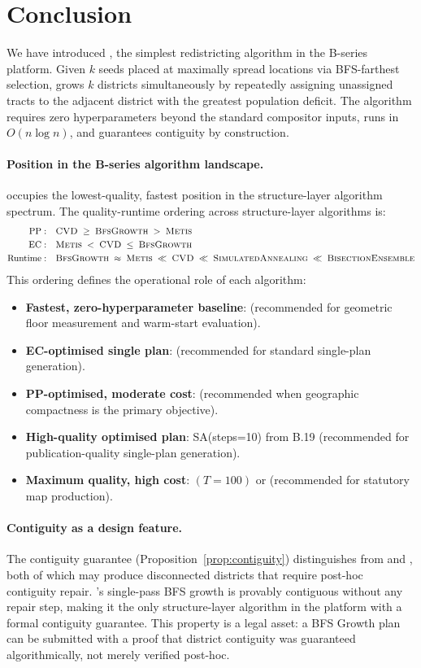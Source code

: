 \section{Conclusion}
\label{sec:conclusion}

We have introduced \bfsg{}, the simplest redistricting algorithm in the
B-series platform.
Given $k$ seeds placed at maximally spread locations via BFS-farthest
selection, \bfsg{} grows $k$ districts simultaneously by repeatedly
assigning unassigned tracts to the adjacent district with the greatest
population deficit.
The algorithm requires zero hyperparameters beyond the standard compositor
inputs, runs in $O(n \log n)$, and guarantees contiguity by construction.

\paragraph{Position in the B-series algorithm landscape.}
\bfsg{} occupies the lowest-quality, fastest position in the structure-layer
algorithm spectrum.
The quality-runtime ordering across structure-layer algorithms is:
\begin{align*}
  \mathrm{PP:} &\quad \textsc{CVD}{} \;\geq\; \textsc{BfsGrowth}{} \;>\; \textsc{Metis}{} \\
  \mathrm{EC:} &\quad \textsc{Metis}{} \;<\; \textsc{CVD}{} \;\leq\; \textsc{BfsGrowth}{} \\
  \mathrm{Runtime:} &\quad \textsc{BfsGrowth}{} \;\approx\; \textsc{Metis}{} \;\ll\; \textsc{CVD}{} \;\ll\; \textsc{SimulatedAnnealing}{} \;\ll\; \textsc{BisectionEnsemble}{}
\end{align*}
This ordering defines the operational role of each algorithm:
\begin{itemize}
\item \textbf{Fastest, zero-hyperparameter baseline}: \bfsg{}
  (recommended for geometric floor measurement and warm-start evaluation).
\item \textbf{EC-optimised single plan}: \metis{}
  (recommended for standard single-plan generation).
\item \textbf{PP-optimised, moderate cost}: \cvd{}
  (recommended when geographic compactness is the primary objective).
\item \textbf{High-quality optimised plan}: SA(steps=10) from B.19
  (recommended for publication-quality single-plan generation).
\item \textbf{Maximum quality, high cost}: \be{}$(T=100)$ or \cs{}
  (recommended for statutory map production).
\end{itemize}

\paragraph{Contiguity as a design feature.}
The contiguity guarantee (Proposition~\ref{prop:contiguity}) distinguishes
\bfsg{} from \metis{} and \cvd{}, both of which may produce disconnected
districts that require post-hoc contiguity repair.
\bfsg{}'s single-pass BFS growth is provably contiguous without any
repair step, making it the only structure-layer algorithm in the platform
with a formal contiguity guarantee.
This property is a legal asset: a BFS Growth plan can be submitted with
a proof that district contiguity was guaranteed algorithmically, not
merely verified post-hoc.

